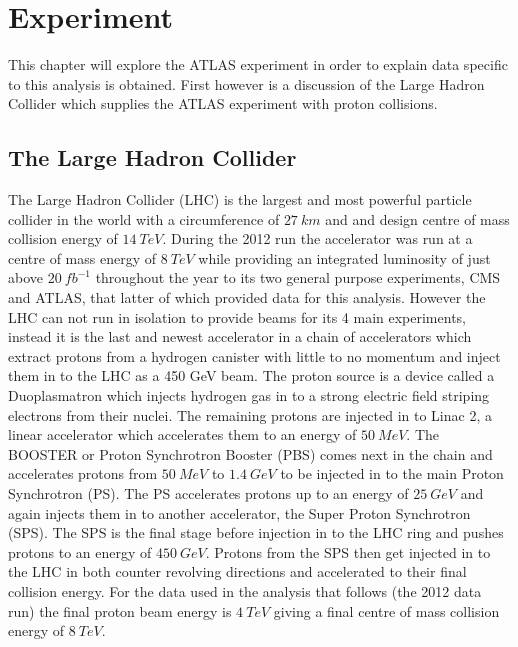\chapter{Experiment}

This chapter will explore the ATLAS experiment in order to explain data specific to this analysis is obtained. First however is a discussion of the Large Hadron Collider which supplies the ATLAS experiment with proton collisions.

\section{The Large Hadron Collider}

The Large Hadron Collider (LHC) is the largest and most powerful particle collider in the world with a circumference of $27~km$ and and design centre of mass collision energy of $14~TeV$. During the 2012 run the accelerator was run at a centre of mass energy of $8~TeV$ while providing an integrated luminosity of just above $20~fb^{-1}$ throughout the year to its two general purpose experiments, CMS and ATLAS, that latter of which provided data for this analysis.
However the LHC can not run in isolation to provide beams for its 4 main experiments, instead it is the last and newest accelerator in a chain of accelerators which extract protons from a hydrogen canister with little to no momentum and inject them in to the LHC as a 450 GeV beam.
The proton source is a device called a Duoplasmatron which injects hydrogen gas in to a strong electric field striping electrons from their nuclei. The remaining protons are injected in to Linac 2, a linear accelerator which accelerates them to an energy of $50~MeV$. The BOOSTER or Proton Synchrotron Booster (PBS) comes next in the chain and accelerates protons from $50~MeV$ to $1.4~GeV$ to be injected in to the main Proton Synchrotron (PS). The PS accelerates protons up to an energy of $25~GeV$ and again injects them in to another accelerator, the Super Proton Synchrotron (SPS). The SPS is the final stage before injection in to the LHC ring and pushes protons to an energy of $450~GeV$. Protons from the SPS then get injected in to the LHC in both counter revolving directions and accelerated to their final collision energy. For the data used in the analysis that follows (the 2012 data run) the final proton beam energy is $4~TeV$ giving a final centre of mass collision energy of $8~TeV$.

